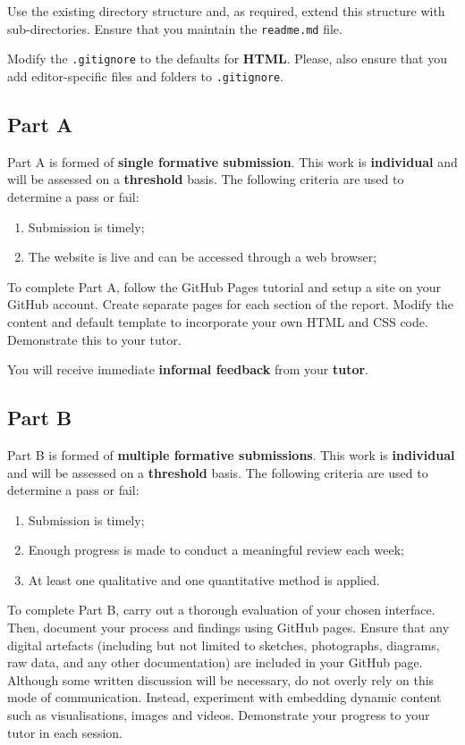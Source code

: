 \documentclass{../../../fal_assignment}
\begin{document}
Use the existing directory structure and, as required, extend this structure with sub-directories. Ensure that you maintain the \texttt{readme.md} file.

Modify the \texttt{.gitignore} to the defaults for \textbf{HTML}. Please, also ensure that you add editor-specific files and folders to \texttt{.gitignore}. 

\subsection*{Part A}

Part A is formed of \textbf{single formative submission}. This work is \textbf{individual} and will be assessed on a \textbf{threshold} basis. The following criteria are used to determine a pass or fail:

\begin{enumerate}[label=(\alph*)]
	\item Submission is timely;
	\item The website is live and can be accessed through a web browser;
\end{enumerate}

To complete Part A, follow the GitHub Pages tutorial and setup a site on your GitHub account. Create separate pages for each section of the report. Modify the content and default template to incorporate your own HTML and CSS code. Demonstrate this to your tutor.

You will receive immediate \textbf{informal feedback} from your \textbf{tutor}.

\subsection*{Part B}

Part B is formed of \textbf{multiple formative submissions}. This work is \textbf{individual} and will be assessed on a \textbf{threshold} basis. The following criteria are used to determine a pass or fail:

\begin{enumerate}[label=(\alph*)]
	\item Submission is timely;
	\item Enough progress is made to conduct a meaningful review each week;
	\item At least one qualitative and one quantitative method is applied.
\end{enumerate}

To complete Part B, carry out a thorough evaluation of your chosen interface. Then, document your process and findings using GitHub pages. Ensure that any digital artefacts (including but not limited to sketches, photographs, diagrams, raw data, and any other documentation) are included in your GitHub page. Although some written discussion will be necessary, do not overly rely on this mode of communication. Instead, experiment with embedding dynamic content such as visualisations, images and videos. Demonstrate your progress to your tutor in each session.
\end{document}
